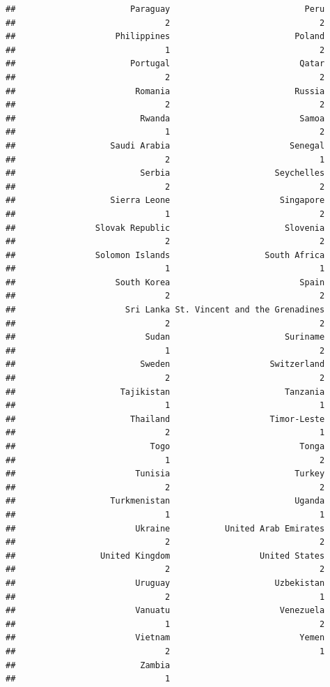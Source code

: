 \documentclass[
]{article}
\begin{document}
\begin{verbatim}
##                       Paraguay                           Peru 
##                              2                              2 
##                    Philippines                         Poland 
##                              1                              2 
##                       Portugal                          Qatar 
##                              2                              2 
##                        Romania                         Russia 
##                              2                              2 
##                         Rwanda                          Samoa 
##                              1                              2 
##                   Saudi Arabia                        Senegal 
##                              2                              1 
##                         Serbia                     Seychelles 
##                              2                              2 
##                   Sierra Leone                      Singapore 
##                              1                              2 
##                Slovak Republic                       Slovenia 
##                              2                              2 
##                Solomon Islands                   South Africa 
##                              1                              1 
##                    South Korea                          Spain 
##                              2                              2 
##                      Sri Lanka St. Vincent and the Grenadines 
##                              2                              2 
##                          Sudan                       Suriname 
##                              1                              2 
##                         Sweden                    Switzerland 
##                              2                              2 
##                     Tajikistan                       Tanzania 
##                              1                              1 
##                       Thailand                    Timor-Leste 
##                              2                              1 
##                           Togo                          Tonga 
##                              1                              2 
##                        Tunisia                         Turkey 
##                              2                              2 
##                   Turkmenistan                         Uganda 
##                              1                              1 
##                        Ukraine           United Arab Emirates 
##                              2                              2 
##                 United Kingdom                  United States 
##                              2                              2 
##                        Uruguay                     Uzbekistan 
##                              2                              1 
##                        Vanuatu                      Venezuela 
##                              1                              2 
##                        Vietnam                          Yemen 
##                              2                              1 
##                         Zambia 
##                              1
\end{verbatim}
\end{document}
